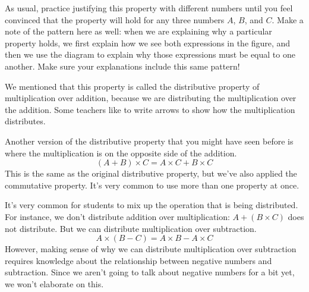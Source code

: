 \documentclass{ximera}
\begin{document}
As usual, practice justifying this property with different numbers until you feel convinced that the property will hold for any three numbers $A$, $B$, and $C$. Make a note of the pattern here as well: when we are explaining why a particular property holds, we first explain how we see both expressions in the figure, and then we use the diagram to explain why those expressions must be equal to one another. Make sure your explanations include this same pattern!

We mentioned that this property is called the distributive property of multiplication over addition, because we are distributing the multiplication over the addition. Some teachers like to write arrows to show how the multiplication distributes.
\begin{image}
\end{image}

Another version of the distributive property that you might have seen before is where the multiplication is on the opposite side of the addition.
\[
(A + B) \times C = A \times C + B \times C
\]
This is the same as the original distributive property, but we've also applied the commutative property. It's very common to use more than one property at once.


It's very common for students to mix up the operation that is being distributed. For instance, we don't distribute addition over multiplication: $A + (B \times C)$ does not distribute. But we can distribute multiplication over subtraction.
\[
A \times (B-C) = A \times B - A \times C
\]
However, making sense of why we can distribute multiplication over subtraction requires knowledge about the relationship between negative numbers and subtraction. Since we aren't going to talk about negative numbers for a bit yet, we won't elaborate on this.
\end{document}
